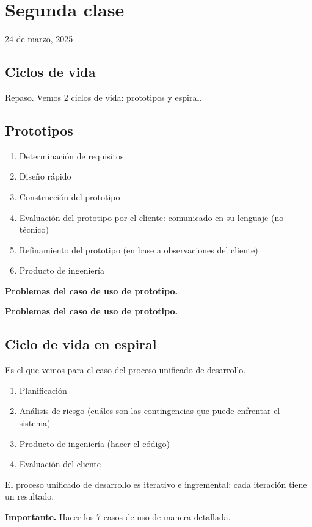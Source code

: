 \section{Segunda clase}

24 de marzo, 2025

\subsection{Ciclos de vida}

Repaso. Vemos 2 ciclos de vida: prototipos y espiral.

\subsection{Prototipos}

\begin{enumerate}
    \item Determinación de requisitos
    \item Diseño rápido
    \item Construcción del prototipo
    \item Evaluación del prototipo por el cliente: comunicado en su lenguaje (no técnico)
    \item Refinamiento del prototipo (en base a observaciones del cliente)
    \item Producto de ingeniería
\end{enumerate}

\textbf{Problemas del caso de uso de prototipo.}

\textbf{Problemas del caso de uso de prototipo.}

\subsection{Ciclo de vida en espiral}

Es el que vemos para el caso del proceso unificado de desarrollo.

\begin{enumerate}
    \item Planificación
    \item Análisis de riesgo (cuáles son las contingencias que puede enfrentar el sistema)
    \item Producto de ingeniería (hacer el código)
    \item Evaluación del cliente 
\end{enumerate}

El proceso unificado de desarrollo es iterativo e ingremental: cada iteración tiene un resultado.

\textbf{Importante.}
Hacer los 7 casos de uso de manera detallada.